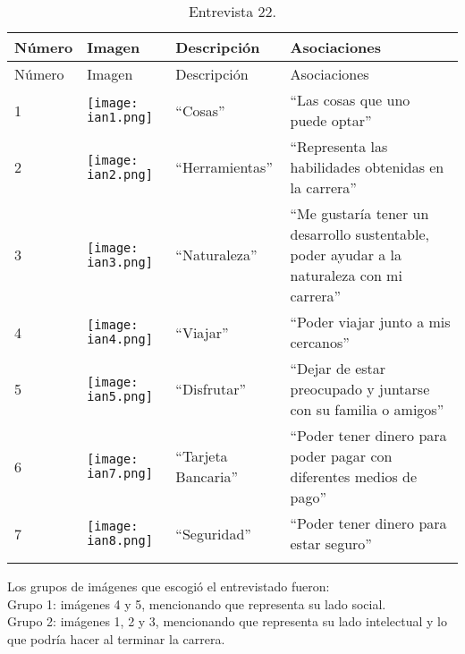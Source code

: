 \begin{longtable}{>{\centering\arraybackslash}m{1cm} >{\centering\arraybackslash}m{2cm} >{\arraybackslash}m{5cm}>{\arraybackslash}m{5cm}}
	
	\hline
	Número & Imagen & Descripción & Asociaciones \\
	\hline \hline
	\endfirsthead
	
	\hline
	Número & Imagen & Descripción & Asociaciones \\
	\hline \hline
	\endhead
		
		1 & \texttt{[image: ian1.png]} & ``Cosas'' & ``Las cosas que uno puede optar'' \\
		\hline
		
		2 & \texttt{[image: ian2.png]} & ``Herramientas'' & ``Representa las habilidades obtenidas en la carrera'' \\
		\hline
		
		3 & \texttt{[image: ian3.png]} & ``Naturaleza'' & ``Me gustaría tener un desarrollo sustentable, poder ayudar a la naturaleza con mi carrera'' \\
		\hline
		
		4 & \texttt{[image: ian4.png]} & ``Viajar'' & ``Poder viajar junto a mis cercanos'' \\
		\hline
		
		5 & \texttt{[image: ian5.png]} & ``Disfrutar'' & ``Dejar de estar preocupado y juntarse con su familia o amigos'' \\
		\hline
		
		
		6 & \texttt{[image: ian7.png]} & ``Tarjeta Bancaria'' & ``Poder tener dinero para poder pagar con diferentes medios de pago'' \\
		\hline	
			
		7 & \texttt{[image: ian8.png]} & ``Seguridad'' & ``Poder tener dinero para estar seguro'' \\
		\hline

	\caption{Entrevista 22.}
	\label{tabla:ian}
\end{longtable}

Los grupos de imágenes que escogió el entrevistado fueron:\\

Grupo 1: imágenes 4 y 5, mencionando que representa su lado social. \\

Grupo 2: imágenes 1, 2 y 3, mencionando que representa su lado intelectual y lo que podría hacer al terminar la carrera.\\

